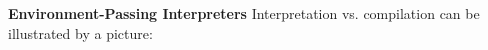 \begin{minipage}[t]{\sw}
\slidenumber
\LARGE
{\bf Environment-Passing Interpreters}\exx
Interpretation vs. compilation can be illustrated by a picture:\exx
{}
\end{minipage}
\clearpage
